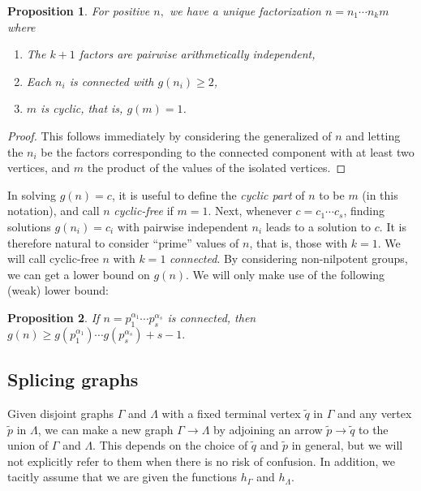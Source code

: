 \documentclass[a4paper, 12pt]{article}
\newcommand{\ufdsh}{p_1^{\alpha_1} \cdots p_s^{\alpha_s}}
\newcommand{\qo}{\tilde{q}}
\newcommand{\pin}{\tilde{p}}
\theoremstyle{plain}
\newtheorem{prop}{Proposition}[section]
\theoremstyle{definition}
\begin{document}
\begin{prop}
	For positive $n,$ we have a unique factorization $n = n_1 \cdots n_k m$ where\pagebreak[3]
	\begin{enumerate} \listspace
		\item The $k + 1$ factors are pairwise arithmetically independent,
		\item Each $n_i$ is connected with $g(n_i) \ge 2$,
		\item $m$ is cyclic, that is, $g(m) = 1$.
	\end{enumerate} \textspace
\end{prop}
\begin{proof}
	This follows immediately by considering the generalized  of $n$ and letting the $n_i$ be the factors corresponding to the connected component with at least two vertices, and $m$ the product of the values of the isolated vertices.
\end{proof}

In solving $g(n) = c$, it is useful to define the \emph{cyclic part} of $n$ to be $m$ (in this notation), and call $n$ \emph{cyclic-free} if $m = 1$. Next, whenever $c = c_1 \cdots c_s$, finding solutions $g(n_i) = c_i$ with pairwise independent $n_i$ leads to a solution to $c$. It is therefore natural to consider ``prime'' values of $n$, that is, those with $k = 1$. We will call cyclic-free $n$ with $k = 1$ \emph{connected}. By considering non-nilpotent groups, we can get a lower bound on $g(n)$. We will only make use of the following (weak) lower bound:

\begin{prop}
	If $n = \ufdsh$ is connected, then $g(n) \ge g(p_1^{\alpha_1})\cdots g(p_s^{\alpha_s}) + s - 1.$
\end{prop}

\subsection{Splicing graphs}
Given disjoint graphs $\Gamma$ and $\Lambda$ with a fixed terminal vertex $\qo$ in $\Gamma$ and any vertex $\pin$ in $\Lambda$, we can make a new graph $\Gamma \rightarrow \Lambda$ by adjoining an arrow $\pin \rightarrow \qo$ to the union of $\Gamma$ and $\Lambda$. This depends on the choice of $\qo$ and $\pin$ in general, but we will not explicitly refer to them when there is no risk of confusion. In addition, we tacitly assume that we are given the functions $h_\Gamma$ and $h_\Lambda$.
\end{document}
